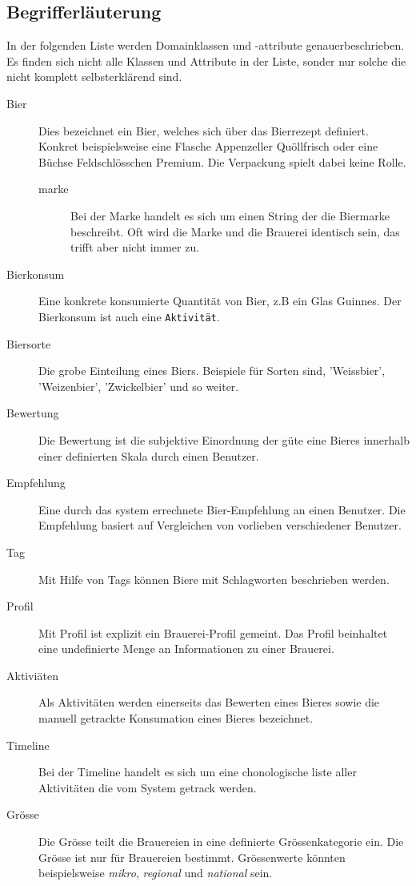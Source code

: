 \documentclass[10pt,a4paper]{scrartcl}
\begin{document}
\subsection{Begrifferläuterung}
In der folgenden Liste werden Domainklassen und -attribute genauerbeschrieben. Es finden sich nicht alle Klassen und Attribute in der Liste, sonder nur solche die nicht komplett selbsterklärend sind.
\begin{description}
	\item[Bier] Dies bezeichnet ein Bier, welches sich über das Bierrezept definiert. Konkret beispielsweise eine Flasche Appenzeller Quöllfrisch oder eine Büchse Feldschlösschen Premium. Die Verpackung spielt dabei keine Rolle.
	\begin{description}
	\item[marke] Bei der Marke handelt es sich um einen String der die Biermarke beschreibt. Oft wird die Marke und die Brauerei identisch sein, das trifft aber nicht immer zu.
	\end{description}
	\item[Bierkonsum] Eine konkrete konsumierte Quantität von Bier, z.B ein Glas Guinnes. Der Bierkonsum ist auch eine \texttt{Aktivität}.
	\item[Biersorte] Die grobe Einteilung eines Biers. Beispiele für Sorten sind, 'Weissbier', 'Weizenbier', 'Zwickelbier' und so weiter.
	\item[Bewertung] Die Bewertung ist die subjektive Einordnung der güte eine Bieres innerhalb einer definierten Skala durch einen Benutzer.
	\item[Empfehlung] Eine durch das system errechnete Bier-Empfehlung an einen Benutzer. Die Empfehlung basiert auf Vergleichen von vorlieben verschiedener Benutzer.
	\item[Tag] Mit Hilfe von Tags können Biere mit Schlagworten beschrieben werden.
	\item[Profil] Mit Profil ist explizit ein Brauerei-Profil gemeint. Das Profil beinhaltet eine undefinierte Menge an Informationen zu einer Brauerei.
	\item[Aktiviäten] Als Aktivitäten werden einerseits das Bewerten eines Bieres sowie die manuell getrackte Konsumation eines Bieres bezeichnet. 
	\item[Timeline] Bei der Timeline handelt es sich um eine chonologische liste aller Aktivitäten die vom System getrack werden.
	\item[Grösse] Die Grösse teilt die Brauereien in eine definierte Grössenkategorie ein. Die Grösse ist nur für Brauereien bestimmt. Grössenwerte könnten beispielsweise \textit{mikro}, \textit{regional} und \textit{national} sein.
\end{description}
\end{document}
